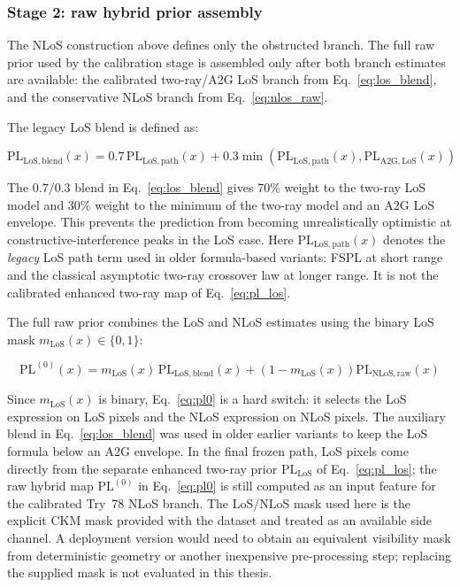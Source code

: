 \subsubsection{Stage 2: raw hybrid prior assembly}

The NLoS construction above defines only the obstructed branch. The full raw
prior used by the calibration stage is assembled only after both branch
estimates are available: the calibrated two-ray/A2G LoS branch from
Eq.~\eqref{eq:los_blend}, and the conservative NLoS branch from
Eq.~\eqref{eq:nlos_raw}.

The legacy LoS blend is defined as:

\begin{equation}
\mathrm{PL}_{\mathrm{LoS,blend}}(x)
=
0.7\,\mathrm{PL}_{\mathrm{LoS,path}}(x)
+0.3\min\left(\mathrm{PL}_{\mathrm{LoS,path}}(x), \mathrm{PL}_{\mathrm{A2G,LoS}}(x)\right)
\label{eq:los_blend}
\end{equation}

The $0.7/0.3$ blend in Eq.~\eqref{eq:los_blend} gives 70\% weight to the
two-ray LoS model and 30\% weight to the minimum of the two-ray model and an
A2G LoS envelope. This prevents the prediction from becoming unrealistically
optimistic at constructive-interference peaks in the LoS case. Here
$\mathrm{PL}_{\mathrm{LoS,path}}(x)$ denotes the \emph{legacy} LoS path term
used in older formula-based variants: FSPL at short range and the classical
asymptotic two-ray crossover law at longer range. It is not the calibrated
enhanced two-ray map of Eq.~\eqref{eq:pl_los}.

The full raw prior combines the LoS and NLoS estimates using the binary LoS
mask $m_{\mathrm{LoS}}(x) \in \{0,1\}$:

\begin{equation}
\mathrm{PL}^{(0)}(x)
=
m_{\mathrm{LoS}}(x)\,\mathrm{PL}_{\mathrm{LoS,blend}}(x)
+
\left(1-m_{\mathrm{LoS}}(x)\right)\mathrm{PL}_{\mathrm{NLoS,raw}}(x)
\label{eq:pl0}
\end{equation}

Since $m_{\mathrm{LoS}}(x)$ is binary, Eq.~\eqref{eq:pl0} is a hard switch:
it selects the LoS expression on LoS pixels and the NLoS expression on NLoS
pixels. The auxiliary blend in Eq.~\eqref{eq:los_blend} was used in older
earlier variants to keep the LoS formula below an A2G envelope. In the final
frozen path, LoS pixels come directly from the separate enhanced two-ray prior
\(\mathrm{PL}_{\mathrm{LoS}}\) of Eq.~\eqref{eq:pl_los}; the raw hybrid map
\(\mathrm{PL}^{(0)}\) in Eq.~\eqref{eq:pl0} is still computed as an input
feature for the calibrated Try~78 NLoS branch.
The LoS/NLoS mask used here is the explicit CKM mask provided with the
dataset and treated as an available side channel. A deployment version would
need to obtain an equivalent visibility mask from deterministic geometry or
another inexpensive pre-processing step; replacing the supplied mask is not
evaluated in this thesis.


